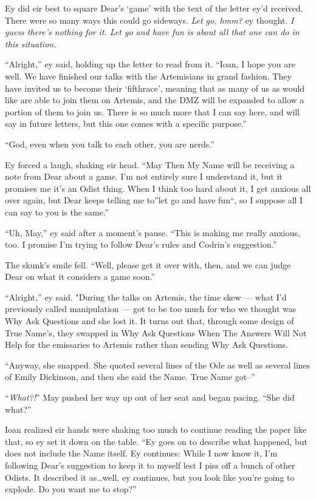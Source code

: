 Ey did eir best to square Dear's `game' with the text of the letter ey'd received. There were so many ways this could go sideways. \emph{Let go, hmm?} ey thought. \emph{I guess there's nothing for it. Let go and have fun is about all that one can do in this situation.}

``Alright,'' ey said, holding up the letter to read from it. ``Ioan, I hope you are well. We have finished our talks with the Artemisians in grand fashion. They have invited us to become their `fifthrace', meaning that as many of us as would like are able to join them on Artemis, and the DMZ will be expanded to allow a portion of them to join us. There is so much more that I can say here, and will say in future letters, but this one comes with a specific purpose.''

``God, even when you talk to each other, you are nerds.''

Ey forced a laugh, shaking eir head. ``May Then My Name will be receiving a note from Dear about a game. I'm not entirely sure I understand it, but it promises me it's an Odist thing. When I think too hard about it, I get anxious all over again, but Dear keeps telling me to''let go and have fun``, so I suppose all I can say to you is the same.''

``Uh, May,'' ey said after a moment's pause. ``This is making me really anxious, too. I promise I'm trying to follow Dear's rules and Codrin's suggestion.''

The skunk's smile fell. ``Well, please get it over with, then, and we can judge Dear on what it considers a game soon.''

``Alright,'' ey said. "During the talks on Artemis, the time skew — what I'd previously called manipulation — got to be too much for who we thought was Why Ask Questions and she lost it. It turns out that, through some design of True Name's, they swapped in Why Ask Questions When The Answers Will Not Help for the emissaries to Artemis rather than sending Why Ask Questions.

``Anyway, she snapped. She quoted several lines of the Ode as well as several lines of Emily Dickinson, and then she said the Name. True Name got--''

``\emph{What?!}'' May pushed her way up out of her seat and began pacing. ``She did what?''

Ioan realized eir hands were shaking too much to continue reading the paper like that, so ey set it down on the table. ``Ey goes on to describe what happened, but does not include the Name itself. Ey continues: While I now know it, I'm following Dear's suggestion to keep it to myself lest I piss off a bunch of other Odists. It described it as\ldots well, ey continues, but you look like you're going to explode. Do you want me to stop?''

